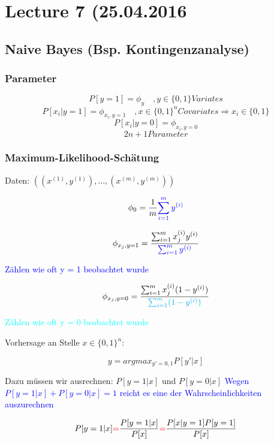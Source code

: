 \bgroup
\newcommand{\xj}[1]{\phi_{x_j, y=#1}}

\section*{Lecture 7 (25.04.2016}
\subsection*{Naive Bayes (Bsp. Kontingenzanalyse)}
	\subsubsection*{Parameter}
		\[ P[y=1] = \phi_y \quad, y \in \{0,1\} Variates\]
		\[ P[x_i|y=1] = \phi_{x_i, y = 1} \quad, x \in \{0,1\}^n Covariates  \Rightarrow x_i \in \{0,1\}\]
		\[ P[x_i|y=0] = \phi_{x_i, y = 0}\]
		\[2n + 1 Parameter \]
	
	\subsubsection*{Maximum-Likelihood-Schätung}
	
		Daten: $ ((x^{(1)},y^{(1)}),\dots,(x^{(m)},y^{(m)}) ) $
		
		\[ \phi_0 = \frac{1}{m} \textcolor{blue}{\sum_{i = 1}^{m} y^{(i)}}\]
		
		\[ \xj{1} = \frac{\sum_{i=1}^{m} x_j ^{(i)} y^{(i)}}{\textcolor{blue}{\sum_{i=1}^{m}y^{(i)}}} \]
			
			\textcolor{blue}{Zählen wie oft y = 1 beobachtet wurde}
			
		\[ \xj{0} =  \frac{\sum_{i=1}^{m} x_j ^{(i)} (1- y^{(i)})}{\textcolor{cyan}{\sum_{i=1}^{m}(1- y^{(i)})}} \]
		
			\textcolor{cyan}{Zählen wie oft y = 0 beobachtet wurde}
			
		Vorhersage an Stelle $ x \in \{0,1\}^n $:
		
		\begin{framed}
			\[ y = argmax_{y' = 0,1} P[y'|x] \]
		\end{framed}
		
		Dazu müssen wir ausrechnen: $ P[y = 1|x] $ und $ P[y = 0|x] $
		\textcolor{blue}{Wegen $ P[y = 1|x] + P[y = 0|x] = 1$ reicht es eine der Wahrscheinlichkeiten auszurechnen} 
		
		\[ P[y = 1|x] \textcolor{red}{=} \frac{P[y = 1|x]}{P[x]} \textcolor{red}{=} \frac{P[x| y = 1]P[y = 1]}{P[x]} \]
		

